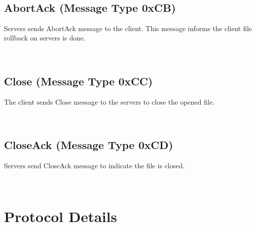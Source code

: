 \documentclass[12pt,fleqn]{article}
\begin{document}
\begin{center}
	\begin{bytefield}[bitwidth=1.1em]{16}
		 \\
	\end{bytefield}
\end{center}

\subsection{AbortAck (Message Type 0xCB)}
Servers sends AbortAck message to the client. This message informs the client file rollback on servers is done.

\begin{center}
	\begin{bytefield}[bitwidth=1.1em]{16}
		 \\
	\end{bytefield}
\end{center}

\subsection{Close (Message Type 0xCC)}
The client sends Close message to the servers to close the opened file.

\begin{center}
	\begin{bytefield}[bitwidth=1.1em]{16}
		 \\
	\end{bytefield}
\end{center}

\subsection{CloseAck (Message Type 0xCD)}
Servers send CloseAck message to indicate the file is closed.

\begin{center}
	\begin{bytefield}[bitwidth=1.1em]{16}
		 \\
	\end{bytefield}
\end{center}

\section{Protocol Details}
\end{document}
